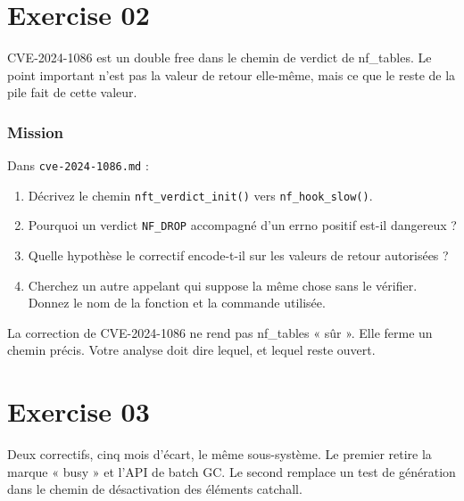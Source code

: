\documentclass{training}
\begin{document}
\chapter{Exercise 02}
\makeheaderfiles

CVE-2024-1086 est un double free dans le chemin de verdict de nf\_tables.
Le point important n'est pas la valeur de retour elle-même, mais ce que le
reste de la pile fait de cette valeur.

\subsection*{Mission}

Dans \texttt{cve-2024-1086.md} :

\begin{enumerate}
  \item Décrivez le chemin \texttt{nft\_verdict\_init()} vers
        \texttt{nf\_hook\_slow()}.
  \item Pourquoi un verdict \texttt{NF\_DROP} accompagné d'un errno positif
        est-il dangereux ?
  \item Quelle hypothèse le correctif encode-t-il sur les valeurs de retour
        autorisées ?
  \item Cherchez un autre appelant qui suppose la même chose sans le
        vérifier. Donnez le nom de la fonction et la commande utilisée.
\end{enumerate}

\begin{warn}
La correction de CVE-2024-1086 ne rend pas nf\_tables « sûr ». Elle ferme
un chemin précis. Votre analyse doit dire lequel, et lequel reste ouvert.
\end{warn}

\chapter{Exercise 03}
\makeheaderfiles

Deux correctifs, cinq mois d'écart, le même sous-système. Le premier retire
la marque « busy » et l'API de batch GC. Le second remplace un test de
génération dans le chemin de désactivation des éléments catchall.
\end{document}
